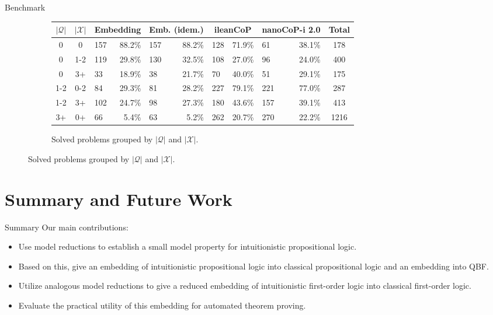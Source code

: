 \documentclass{cubeamer}
\begin{document}
	\begin{frame}{Benchmark}
		\begin{figure}
			\begin{subfigure}{\textwidth}			
				\centering
					\begin{tabular}{c|c|lr|lr|lr|lr|c}
		$|\mathcal Q|$&$|\mathcal X|$&\multicolumn{2}{c}{Embedding}&\multicolumn{2}{c}{Emb. (idem.)}&\multicolumn{2}{c}{ileanCoP}&\multicolumn{2}{c}{nanoCoP-i 2.0}&Total\\\hline
		0&0		&157&88.2\%	&157&88.2\%		&128&71.9\%		&61&38.1\%	&178\\
		0&1-2	&119&29.8\%&130&32.5\%		&108&27.0\%		&96&24.0\%	&400\\
		0&3+	&33&18.9\%	&38&21.7\%		&70&40.0\%		&51&29.1\%	&175\\
		1-2&0-2	&84&29.3\%	&81&28.2\%		&227&79.1\%		&221&77.0\%	&287\\
		1-2&3+	&102&24.7\%	&98&27.3\%		&180&43.6\%		&157&39.1\%	&413\\
		3+&0+	&66&5.4\%	&63&5.2\%		&262&20.7\%		&270&22.2\%	&1216\\
					\end{tabular}
					\caption{Solved problems grouped by $|\mathcal Q|$ and $|\mathcal X|$.}
				\end{subfigure}
		\end{figure}
	\end{frame}

	\section{Summary and Future Work}
	
	\begin{frame}{Summary}
		Our main contributions:
		\begin{itemize}
			\item Use model reductions to establish a small model property for intuitionistic propositional logic.
			\item Based on this, give an embedding of intuitionistic propositional logic into classical propositional logic and an embedding into QBF.
			\item Utilize analogous model reductions to give a reduced embedding of intuitionistic first-order logic into classical first-order logic.
			\item Evaluate the practical utility of this embedding for automated theorem proving.
		\end{itemize}
	\end{frame}
\end{document}
